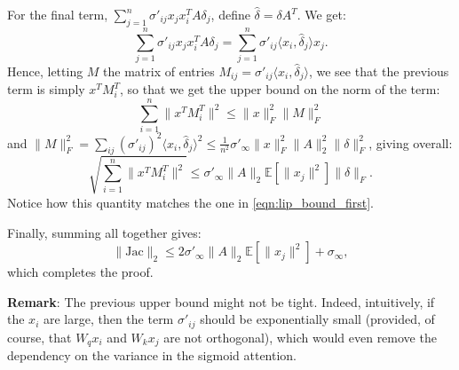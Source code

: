 For the final term, $\sum_{j=1}^n\sigma'_{ij}x_jx_i^TA\delta_j$, define $\hat{\delta} = \delta A^T$. We get:
\begin{equation}
    \sum_{j=1}^n\sigma'_{ij}x_jx_i^TA\delta_j = \sum_{j=1}^n\sigma'_{ij}\langle x_i,\hat{\delta}_j\rangle x_j .
\end{equation}
Hence, letting $M$ the matrix of entries $M_{ij} = \sigma'_{ij}\langle x_i,\hat{\delta}_j\rangle$, we see that the previous term is simply $x^TM_i^T$, so that we get the upper bound on the norm of the term:
\begin{equation}
    \sum_{i=1}^n \|x^TM_i^T\|^2 \leq \|x\|_F^2 \|M\|_F^2 
\end{equation}
and $\|M\|_F^2 = \sum_{ij}(\sigma'_{ij})^2\langle x_i,\hat{\delta}_j\rangle^2 \leq \frac{1}{n^2} \sigma'_{\infty}\|x\|_F^2\|A\|_2^2\|\delta\|_F^2$, giving overall:
\begin{equation}
    \sqrt{\sum_{i=1}^n \|x^TM_i^T\|^2} \leq \sigma'_{\infty} \|A\|_2\mathbb{E}[\|x_j\|^2]\|\delta\|_F .
\end{equation}
Notice how this quantity matches the one in \cref{eqn:lip_bound_first}.

Finally, summing all together gives:
\begin{equation}
    \|\mathrm{Jac}\|_2\leq 2\sigma'_{\infty} \|A\|_2\mathbb{E}[\|x_j\|^2] + \sigma_{\infty},
\end{equation}
which completes the proof.

\textbf{Remark}: The previous upper bound might not be tight. Indeed, intuitively, if the $x_i$ are large, then the term $\sigma'_{ij}$ should be exponentially small (provided, of course, that $W_qx_i$ and $W_kx_j$ are not orthogonal), which would even remove the dependency on the variance in the sigmoid attention. 

